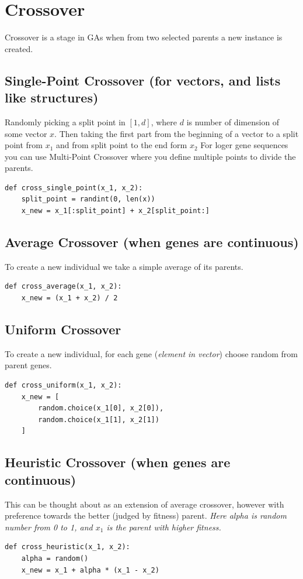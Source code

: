 \documentclass[11pt]{article}
\begin{document}
    \section{Crossover}\label{sec:crossover}
    Crossover is a stage in GAs when from two selected parents a new instance is created.\\

    \subsection{Single-Point Crossover (for vectors, and lists like structures)}\label{subsec:single-point-crossover}
    Randomly picking a split point in $\left[ 1, d \right]$, where $d$ is number of dimension of some vector $x$.
    Then taking the first part from the beginning of a vector to a split point from $x_1$ and from split point to the end form $x_2$
    For loger gene sequences you can use Multi-Point Crossover where you define multiple points to divide the parents.
    \begin{verbatim}
def cross_single_point(x_1, x_2):
    split_point = randint(0, len(x))
    x_new = x_1[:split_point] + x_2[split_point:]
    \end{verbatim}
    
    \subsection{Average Crossover (when genes are continuous)}\label{subsec:average-crossover}
    To create a new individual we take a simple average of its parents.
    \begin{verbatim}
def cross_average(x_1, x_2):
    x_new = (x_1 + x_2) / 2
    \end{verbatim}
    
    \subsection{Uniform Crossover}\label{subsec:uniform-crossover}
    To create a new individual, for each gene (\textit{element in vector}) choose random from parent genes.
    \begin{verbatim}
def cross_uniform(x_1, x_2):
    x_new = [
        random.choice(x_1[0], x_2[0]),
        random.choice(x_1[1], x_2[1])
    ]
    \end{verbatim}
    
    \subsection{Heuristic Crossover (when genes are continuous)}\label{subsec:heuristic-crossover}
    This can be thought about as an extension of average crossover, however with preference towards the better (judged by fitness) parent.
    \textit{Here alpha is random number from 0 to 1, and $x_1$ is the parent with higher fitness.}
    \begin{verbatim}
def cross_heuristic(x_1, x_2):
    alpha = random()
    x_new = x_1 + alpha * (x_1 - x_2)
    \end{verbatim}
    
\end{document}

